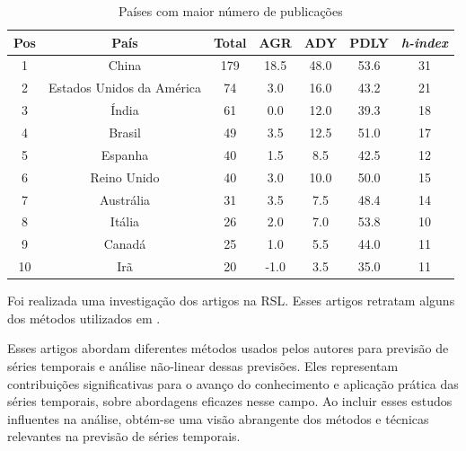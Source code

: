 \begin{table}[H]
	\centering
	\caption{Países com maior número de publicações}\label{tb:pais}
	\begin{tabular}{ccccccc}
		\toprule
		Pos & País & Total & AGR & ADY & PDLY & \textit{h-index} \\
		\midrule
		1 & China & 179 & 18.5 & 48.0 & 53.6 & 31 \\
		2 & Estados Unidos da América & 74 & 3.0 & 16.0 & 43.2 & 21 \\
		3 & Índia & 61 & 0.0 & 12.0 & 39.3 & 18 \\
		4 & Brasil & 49 & 3.5 & 12.5 & 51.0 & 17 \\
		5 & Espanha & 40 & 1.5 & 8.5 & 42.5 & 12 \\
		6 & Reino Unido & 40 & 3.0 & 10.0 & 50.0 & 15 \\
		7 & Austrália & 31 & 3.5 & 7.5 & 48.4 & 14 \\
		8 & Itália & 26 & 2.0 & 7.0 & 53.8 & 10 \\
		9 & Canadá & 25 & 1.0 & 5.5 & 44.0 & 11 \\
		10 & Irã & 20 & -1.0 & 3.5 & 35.0 & 11 \\
		\bottomrule
	\end{tabular}
	
	
\end{table}



Foi realizada uma investigação dos artigos na RSL. Esses artigos retratam alguns dos métodos utilizados em 
.

Esses artigos abordam diferentes métodos usados pelos autores para previsão de séries temporais e análise não-linear dessas previsões. Eles representam contribuições significativas para o avanço do conhecimento e aplicação prática das séries temporais, sobre abordagens eficazes nesse campo. Ao incluir esses estudos influentes na análise, obtém-se uma visão abrangente dos métodos e técnicas  relevantes na previsão de séries temporais.

